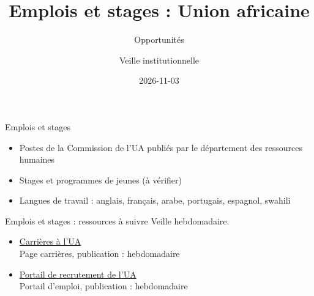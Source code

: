 \documentclass[aspectratio=169,11pt]{beamer}
\title{Emplois et stages : Union africaine}
\subtitle{Opportunités}
\author{Veille institutionnelle}
\date{2026-11-03}
\begin{document}
\begin{frame}\titlepage\end{frame}

\begin{frame}{Emplois et stages}
\begin{itemize}
\item Postes de la Commission de l'UA publiés par le département des ressources humaines
\item Stages et programmes de jeunes (à vérifier)
\item Langues de travail : anglais, français, arabe, portugais, espagnol, swahili
\end{itemize}
\end{frame}

\begin{frame}{Emplois et stages : ressources à suivre}
\small
Veille hebdomadaire.
\begin{itemize}
\item \href{https://au.int/en/careers}{Carrières à l'UA}\\{\footnotesize Page carrières, publication : hebdomadaire}
\item \href{https://jobs.au.int}{Portail de recrutement de l'UA}\\{\footnotesize Portail d'emploi, publication : hebdomadaire}
\end{itemize}
\end{frame}
\end{document}
